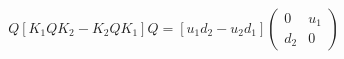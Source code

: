 \begin{equation}
Q[K_1 Q K_2 -K_2 Q K_1]Q= [u_1 d_2 -u_2 d_1] \left( \begin{array}{cc}
0  & u_1  \\
d_2  & 0
\end{array}  \right)
\end{equation}

